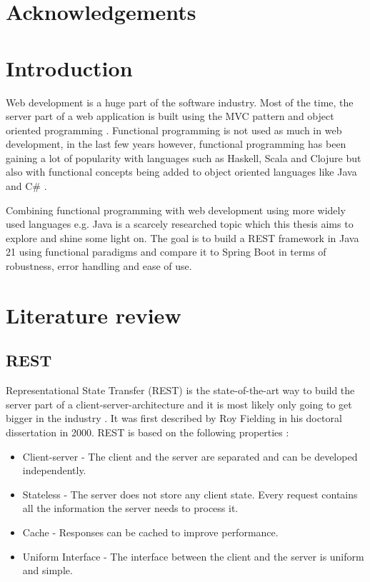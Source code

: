\documentclass[a4paper]{article}
\begin{document}
\newpage

\section*{Acknowledgements}
\blindtext

\newpage

\tableofcontents

\newpage

\section{Introduction}

Web development is a huge part of the software industry. Most of the time, the server part of a web application
is built using the MVC pattern and object oriented programming \cite{damir2021architecture}.
Functional programming is not used as much in web development, in the last few years however, functional programming
has been gaining a lot of popularity with languages such as Haskell, Scala and Clojure but also with functional concepts
being added to object oriented languages like Java and C\# \cite{klint2022functional}.\newline

\noindent Combining functional programming with web development using more widely used languages e.g. Java is a scarcely
researched topic which this thesis aims to explore and shine some light on. The goal is to build a REST framework
in Java 21 using functional paradigms and compare it to Spring Boot in terms of robustness, error handling and ease of use.

\section{Literature review}
\subsection{REST}

Representational State Transfer (REST) is the state-of-the-art way to build the server part
of a client-server-architecture and it is most likely only going to get bigger in the industry \cite{halili2018web}.
It was first described by Roy Fielding in his doctoral dissertation in 2000.
REST is based on the following properties \cite{fielding2000architectural}:

\begin{itemize}
	\item Client-server - The client and the server are separated and can be developed independently.
	\item Stateless - The server does not store any client state. Every request contains all the information
	      the server needs to process it.
	\item Cache - Responses can be cached to improve performance.
	\item Uniform Interface - The interface between the client and the server is uniform and simple.
\end{itemize}
\end{document}

